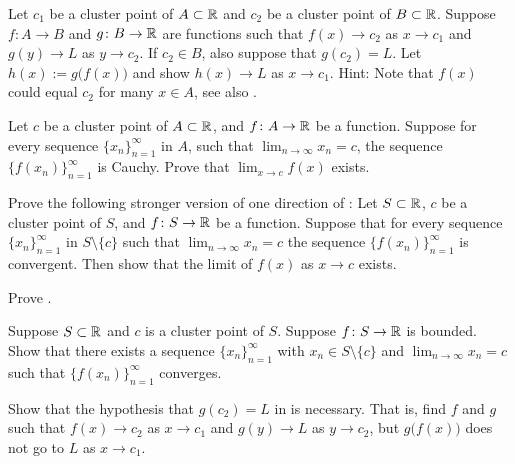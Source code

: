 \begin{exercise} \label{exercise:contlimitcomposition}
Let $c_1$ be a cluster point of $A \subset {\mathbb{R}}$ and $c_2$ be
a cluster point of $B \subset {\mathbb{R}}$.  Suppose 
$f \colon A \to B$ and $g \colon B \to {\mathbb{R}}$ are functions
such that
$f(x) \to c_2$ as $x \to c_1$ and
$g(y) \to L$ as $y \to c_2$.  If $c_2 \in B$, also suppose that $g(c_2) = L$.  Let $h(x) := g\bigl(f(x)\bigr)$ and show
$h(x) \to L$ as $x \to c_1$.
Hint: Note that $f(x)$ could equal $c_2$ for many $x \in A$,
see also
.
\end{exercise}

\begin{exercise}
Let $c$ be a cluster point of $A \subset {\mathbb{R}}$, and $f \colon A \to {\mathbb{R}}$
be a function.  Suppose for every sequence $\{x_n\}_{n=1}^\infty$ in $A$,
such that $\lim_{n\to\infty} x_n = c$,
the sequence $\bigl\{ f(x_n) \bigr\}_{n=1}^\infty$ is Cauchy.  Prove that
$\lim_{x\to c} f(x)$ exists.
\end{exercise}

\begin{exercise} \label{exercise:seqflimitalt}
Prove the following stronger version of one direction of
:
Let $S \subset {\mathbb{R}}$, $c$ be a cluster point of $S$, and $f \colon S \to
{\mathbb{R}}$ be a function.
Suppose that for every sequence $\{x_n\}_{n=1}^\infty$ in $S \setminus \{c\}$ such that
$\lim_{n\to\infty} x_n = c$ the sequence $\bigl\{ f(x_n) \bigr\}_{n=1}^\infty$ is convergent.
Then show that the limit of $f(x)$ as $x \to c$ exists.
\end{exercise}

\begin{exercise}
Prove .
\end{exercise}

\begin{exercise}
Suppose $S \subset {\mathbb{R}}$ and $c$ is a cluster point of $S$.  Suppose $f \colon
S \to {\mathbb{R}}$ is bounded.  Show that there exists a sequence
$\{ x_n \}_{n=1}^\infty$
with $x_n \in S \setminus \{ c \}$ and $\lim_{n\to\infty} x_n = c$ such that
$\bigl\{ f(x_n) \bigr\}_{n=1}^\infty$ converges.
\end{exercise}

\begin{exercise}[Challenging] \label{exercise:contlimitbadcomposition}
Show that the hypothesis that $g(c_2) = L$ in
 is necessary.  That is, find $f$
and $g$ such that $f(x) \to c_2$ as $x \to c_1$ and
$g(y) \to L$ as $y \to c_2$, but $g\bigl(f(x)\bigr)$ does not go to $L$
as $x \to c_1$.
\end{exercise}

